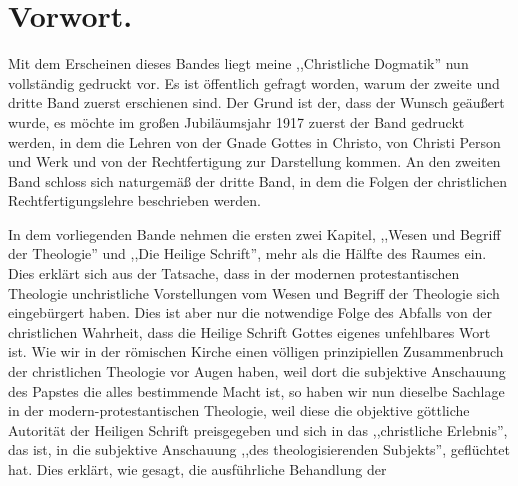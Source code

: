 \section*{Vorwort.}

Mit dem Erscheinen dieses Bandes liegt meine ,,Christliche Dogmatik'' nun vollständig gedruckt vor. Es ist öffentlich gefragt worden, warum der zweite und dritte Band zuerst erschienen sind. Der Grund ist der, dass der Wunsch geäußert wurde, es möchte im großen Jubiläumsjahr 1917 zuerst der Band gedruckt werden, in dem die Lehren von der Gnade Gottes in Christo, von Christi Person und Werk und von der Rechtfertigung zur Darstellung kommen. An den zweiten Band schloss sich naturgemäß der dritte Band, in dem die Folgen der christlichen Rechtfertigungslehre beschrieben werden.

In dem vorliegenden Bande nehmen die ersten zwei Kapitel, ,,Wesen und Begriff der Theologie'' und ,,Die Heilige Schrift'', mehr als die Hälfte des Raumes ein. Dies erklärt sich aus der Tatsache, dass in der modernen protestantischen Theologie unchristliche Vorstellungen vom Wesen und Begriff der Theologie sich eingebürgert haben. Dies ist aber nur die notwendige Folge des Abfalls von der christlichen Wahrheit, dass die Heilige Schrift Gottes eigenes unfehlbares Wort ist. Wie wir in der römischen Kirche einen völligen prinzipiellen Zusammenbruch der christlichen Theologie vor Augen haben, weil dort die subjektive Anschauung des Papstes die alles bestimmende Macht ist, so haben wir nun dieselbe Sachlage in der modern-protestantischen Theologie, weil diese die objektive göttliche Autorität der Heiligen Schrift preisgegeben und sich in das ,,christliche Erlebnis'', das ist, in die subjektive Anschauung ,,des theologisierenden Subjekts'', geflüchtet hat. Dies erklärt, wie gesagt, die ausführliche Behandlung der